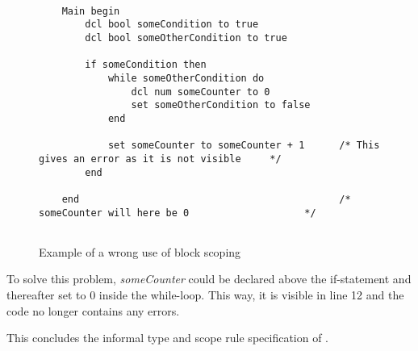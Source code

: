 \begin{figure}[H]
    \centering
    
    \begin{lstlisting}[style=gglang]
    
    Main begin
        dcl bool someCondition to true
        dcl bool someOtherCondition to true
        
        if someCondition then
            while someOtherCondition do
                dcl num someCounter to 0
                set someOtherCondition to false
            end
            
            set someCounter to someCounter + 1      /* This gives an error as it is not visible     */
        end
        
    end                                             /* someCounter will here be 0                    */
    
    \end{lstlisting}
    \caption{Example of a wrong use of block scoping}
    \label{fig:blockscope}
\end{figure}

To solve this problem, \textit{someCounter} could be declared above the if-statement and thereafter set to 0 inside the while-loop. This way, it is visible in line 12 and the code no longer contains any errors.

This concludes the informal type and scope rule specification of \lang{}.

